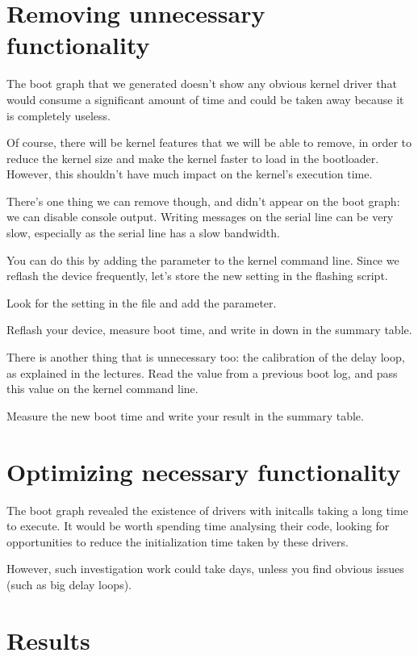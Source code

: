 \section{Removing unnecessary functionality}

The boot graph that we generated doesn't show any obvious kernel
driver that would consume a significant amount of time and could be
taken away because it is completely useless.

Of course, there will be kernel features that we will be able to remove,
in order to reduce the kernel size and make the kernel faster to load
in the bootloader. However, this shouldn't have much impact on the
kernel's execution time.

There's one thing we can remove though, and didn't appear on the boot
graph: we can disable console output. Writing messages on the serial
line can be very slow, especially as the serial line has a slow
bandwidth.

You can do this by adding the  parameter to the kernel
command line. Since we reflash the device frequently, let's store
the new setting in the flashing script.

Look for the  setting in the
 file and add the 
parameter.

Reflash your device, measure boot time, and write in down in the summary
table.

There is another thing that is unnecessary too: the calibration of the
delay loop, as explained in the lectures. Read the  value from
a previous boot log, and pass this value on the kernel command line.

Measure the new boot time and write your result in the summary table.

\section{Optimizing necessary functionality}

The boot graph revealed the existence of drivers with initcalls taking a
long time to execute. It would
be worth spending time analysing their code, looking for opportunities to
reduce the initialization time taken by these drivers.

However, such investigation work could take days, unless you find
obvious issues (such as big delay loops).

\section{Results}

